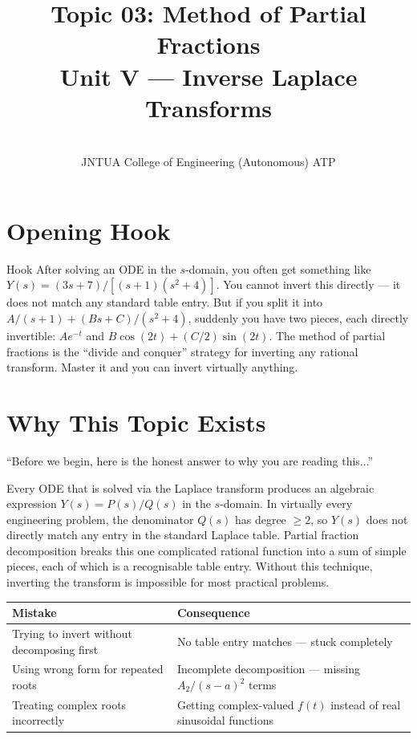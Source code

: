 \documentclass[12pt,a4paper]{article}
\title{Topic 03: Method of Partial Fractions \\ \large Unit V --- Inverse Laplace Transforms}
\author{\\
JNTUA College of Engineering (Autonomous) ATP}
\date{}
\begin{document}
\maketitle
\tableofcontents
\newpage

\section{Opening Hook}
\begin{curiositybox}{Hook}
After solving an ODE in the $s$-domain, you often get something like
$Y(s) = (3s+7)/[(s+1)(s^2+4)]$. You cannot invert this directly --- it does
not match any standard table entry. But if you split it into
$A/(s+1) + (Bs+C)/(s^2+4)$, suddenly you have two pieces, each directly
invertible: $Ae^{-t}$ and $B\cos(2t) + (C/2)\sin(2t)$. The method of
partial fractions is the ``divide and conquer'' strategy for inverting any
rational transform. Master it and you can invert virtually anything.
\end{curiositybox}

\section{Why This Topic Exists}
``Before we begin, here is the honest answer to why you are reading this...''

Every ODE that is solved via the Laplace transform produces an algebraic
expression $Y(s) = P(s)/Q(s)$ in the $s$-domain. In virtually every
engineering problem, the denominator $Q(s)$ has degree $\geq 2$, so $Y(s)$
does not directly match any entry in the standard Laplace table.
Partial fraction decomposition breaks this one complicated rational function
into a sum of simple pieces, each of which is a recognisable table entry.
Without this technique, inverting the transform is impossible for most
practical problems.

\begin{center}
\begin{tabular}{@{}p{6cm}p{7cm}@{}}
\toprule
\textbf{Mistake} & \textbf{Consequence} \\
\midrule
Trying to invert without decomposing first &
  No table entry matches --- stuck completely \\
Using wrong form for repeated roots &
  Incomplete decomposition --- missing $A_2/(s-a)^2$ terms \\
Treating complex roots incorrectly &
  Getting complex-valued $f(t)$ instead of real sinusoidal functions \\
\bottomrule
\end{tabular}
\end{center}
\end{document}
